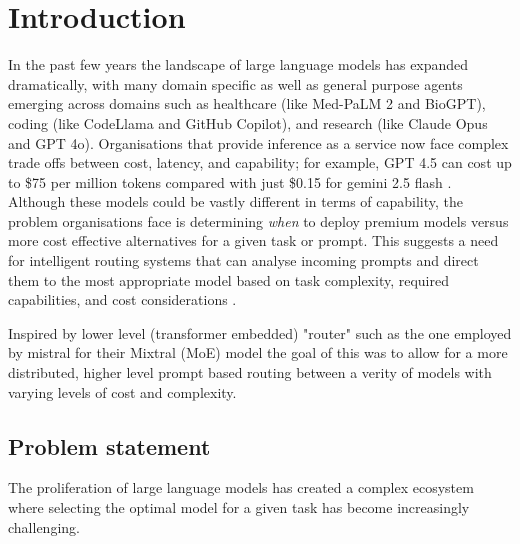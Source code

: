 \chapter{Introduction}
\label{ch:into}

In the past few years the landscape of large language models has expanded dramatically, with many domain specific as well as general purpose agents emerging across domains such as healthcare (like Med-PaLM 2 and BioGPT), coding (like CodeLlama and GitHub Copilot), and research (like Claude Opus and GPT 4o). Organisations that provide inference as a service now face complex trade offs between cost, latency, and capability; for example, GPT 4.5 can cost up to \$75 per million tokens compared with just \$0.15 for gemini 2.5 flash \citep{llmpricing}. Although these models could be vastly different in terms of capability, the problem organisations face is determining \textit{when} to deploy premium models versus more cost effective alternatives for a given task or prompt. This suggests a need for intelligent routing systems that can analyse incoming prompts and direct them to the most appropriate model based on task complexity, required capabilities, and cost considerations \citep{artificialanalysis}.

Inspired by lower level (transformer embedded) "router" such as the one employed by mistral for their Mixtral (MoE) model the goal of this was to allow for a more distributed, higher level prompt based routing between a verity of models with varying levels of cost and complexity.


\section{Problem statement}
\label{sec:intro_prob_art}

The proliferation of large language models has created a complex ecosystem where selecting the optimal model for a given task has become increasingly challenging.

